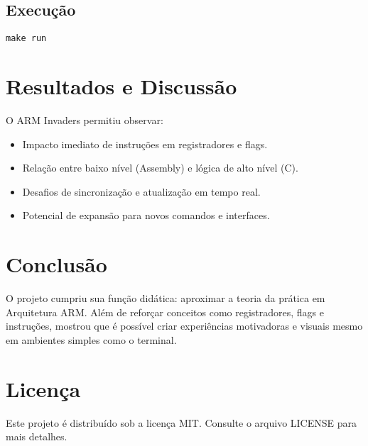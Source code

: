 \documentclass[12pt,a4paper]{report}
\begin{document}
\section*{Execução}
\begin{verbatim}
make run
\end{verbatim}

\chapter{Resultados e Discussão}
O ARM Invaders permitiu observar:
\begin{itemize}
    \item Impacto imediato de instruções em registradores e flags.
    \item Relação entre baixo nível (Assembly) e lógica de alto nível (C).
    \item Desafios de sincronização e atualização em tempo real.
    \item Potencial de expansão para novos comandos e interfaces.
\end{itemize}

\chapter{Conclusão}
O projeto cumpriu sua função didática: aproximar a teoria da prática em Arquitetura ARM.  
Além de reforçar conceitos como registradores, flags e instruções, mostrou que é possível criar experiências motivadoras e visuais mesmo em ambientes simples como o terminal.

\chapter{Licença}
Este projeto é distribuído sob a licença MIT. Consulte o arquivo LICENSE para mais detalhes.
\end{document}
